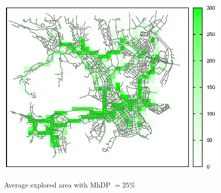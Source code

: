 \begin{figure}[htbp]
{\includegraphics[scale=0.85]{grafici/mappe/M2MShare_3_hop_25perc.eps}}
\caption{Average explored area with MhDP $= 25\%$\label{fig:mappaMultiHop_25}}
\end{figure}

